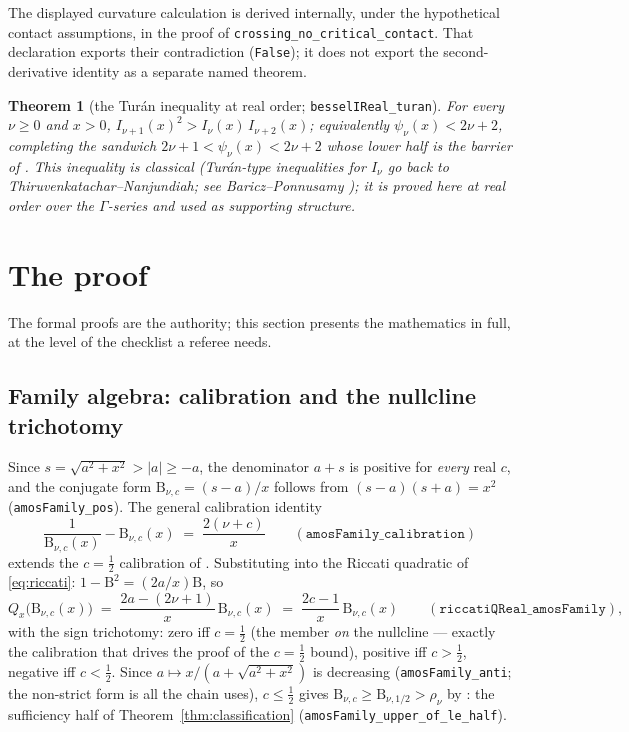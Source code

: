 \documentclass[11pt]{article}
\newtheorem{theorem}{Theorem}[section]
\newcommand{\lean}[1]{\texttt{#1}}
\newcommand{\Bfam}{\mathrm{B}}
\begin{document}
The displayed curvature calculation is derived internally, under the
hypothetical contact assumptions, in the proof of
\lean{crossing\_no\_critical\_contact}.  That declaration exports their
contradiction (\lean{False}); it does not export the second-derivative
identity as a separate named theorem.

\begin{theorem}[the Tur\'an inequality at real order;
\lean{besselIReal\_turan}]\label{thm:turan}
For every $\nu \ge 0$ and $x > 0$,
$I_{\nu+1}(x)^2 > I_\nu(x)\, I_{\nu+2}(x)$; equivalently
$\psi_\nu(x) < 2\nu+2$, completing the sandwich
$2\nu+1 < \psi_\nu(x) < 2\nu+2$ whose lower half is the barrier of
\cite{ErikssonC4}.  This inequality is classical (Tur\'an-type
inequalities for $I_\nu$ go back to Thiruvenkatachar--Nanjundiah;
see Baricz--Ponnusamy \cite{BP13}); it is proved here at real order
over the $\Gamma$-series and used as supporting structure.
\end{theorem}

\section{The proof}\label{sec:proof}

The formal proofs are the authority; this section presents the
mathematics in full, at the level of the checklist a referee needs.

\subsection{Family algebra: calibration and the nullcline
trichotomy}\label{sec:family}

Since $s = \sqrt{a^2+x^2} > |a| \ge -a$, the denominator $a+s$ is
positive for \emph{every} real $c$, and the conjugate form
$\Bfam_{\nu,c} = (s-a)/x$ follows from $(s-a)(s+a) = x^2$
(\lean{amosFamily\_pos}).  The general calibration identity
\begin{equation}\label{eq:calibration}
\frac{1}{\Bfam_{\nu,c}(x)} - \Bfam_{\nu,c}(x) \;=\;
\frac{2(\nu+c)}{x}
\qquad (\lean{amosFamily\_calibration})
\end{equation}
extends the $c = \tfrac12$ calibration of \cite{ErikssonC4}.
Substituting into the Riccati quadratic of \eqref{eq:riccati}:
$1 - \Bfam^2 = (2a/x)\Bfam$, so
\begin{equation}\label{eq:nullcline}
Q_x\bigl(\Bfam_{\nu,c}(x)\bigr) \;=\;
\frac{2a - (2\nu+1)}{x}\,\Bfam_{\nu,c}(x) \;=\;
\frac{2c-1}{x}\,\Bfam_{\nu,c}(x)
\qquad (\lean{riccatiQReal\_amosFamily}),
\end{equation}
with the sign trichotomy: zero iff $c = \tfrac12$ (the member
\emph{on} the nullcline --- exactly the calibration that drives the
proof of the $c=\tfrac12$ bound), positive iff $c > \tfrac12$,
negative iff $c < \tfrac12$.  Since
$a \mapsto x/(a+\sqrt{a^2+x^2})$ is decreasing
(\lean{amosFamily\_anti}; the non-strict form is all the chain
uses), $c \le \tfrac12$ gives
$\Bfam_{\nu,c} \ge \Bfam_{\nu,1/2} > \rho_\nu$ by
\cite{ErikssonC4}: the sufficiency half of
Theorem~\ref{thm:classification}
(\lean{amosFamily\_upper\_of\_le\_half}).
\end{document}
